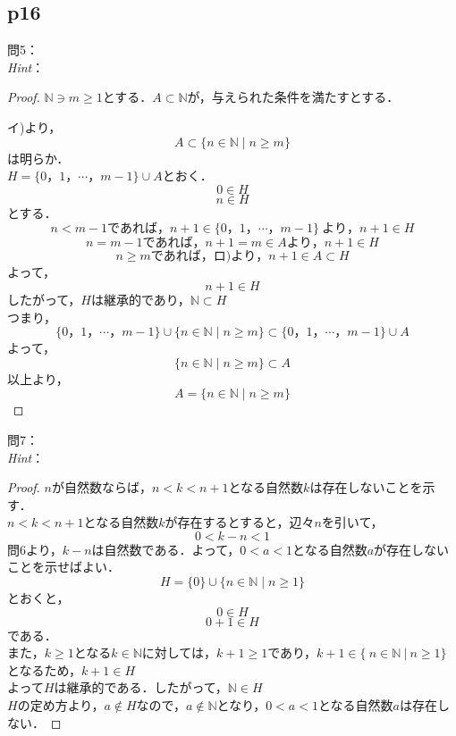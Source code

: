 \documentclass[dvipdfmx,uplatex,11pt]{jsarticle}
\begin{document}
\subsection{p16}
\noindent
問5：
\\
\textsl{Hint}：\\
\dotfill
%
% 
%
\begin{leftbar}
	\begin{proof}
		$\mathbb{N} \ni m \ge 1$とする．$A \subset \mathbb{N}$が，与えられた条件を満たすとする．\par
		イ)より，
		\[ A \subset \{n \in \mathbb{N} \mid n \ge m\} \]
		は明らか．\\
		$H=\{0，1，\cdots，m-1\} \cup A$とおく．
		\begin{equation}
			0 \in H
		\end{equation}
		\begin{equation}
			n \in H
		\end{equation}
		とする．\\
		\[ n<m-1であれば，n+1 \in \{0，1，\cdots，m-1\}~より，n+1 \in H \]
		\[ n=m-1であれば，n+1=m \in Aより，n+1 \in H\]
		\[ n \ge mであれば，ロ)より，n+1 \in A \subset H \]
		よって，
		\[
			n+1 \in H
		\]
		したがって，$H$は継承的であり，$\mathbb{N} \subset H$\\
		つまり，\\
		\[
			\{0，1，\cdots，m-1\} \cup \{n \in \mathbb{N} \mid n \ge m \} \subset \{0，1，\cdots，m-1\} \cup A
		\]
		よって，
		\[
			\{n \in \mathbb{N}\mid n \ge m \} \subset A
		\]
		以上より，
		\[
			A=\{n \in \mathbb{N} \mid n \ge m\}
		\]
	\end{proof}
\end{leftbar}
%
\newpage
%
\noindent
問7：
\\
\textsl{Hint}：\\
\dotfill
%
\begin{leftbar}
	\begin{proof}
		$n$が自然数ならば，$n <k <n+1$となる自然数$k$は存在しないことを示す．\\
		$n < k < n+1$となる自然数$k$が存在するとすると，辺々$n$を引いて，
		\[ 0 < k - n < 1 \]
		問6より，$k-n$は自然数である．よって，$0<a<1$となる自然数$a$が存在しないことを示せばよい．\\
		\[ H=\{0\} \cup \{n \in \mathbb{N} \mid n \ge 1 \} \]
		とおくと，
		\begin{equation}
			0 \in H
		\end{equation}
		\begin{equation}
			0+1 \in H
		\end{equation}
		である．\\
		また，$k \ge 1$となる$k \in \mathbb{N}$に対しては，$k +1 \ge 1$であり，$k+1 \in \{~n \in \mathbb{N}~|~n \ge 1 \} $となるため，$k+1 \in H$\\
		よって$H$は継承的である．したがって，$\mathbb{N} \in H$\\
		$H$の定め方より，$a \notin H$なので，$a \notin \mathbb{N}$となり，$0<a<1$となる自然数$a$は存在しない．
	\end{proof}
\end{leftbar}
%
\newpage
%
\setcounter{equation}{0}
\end{document}
